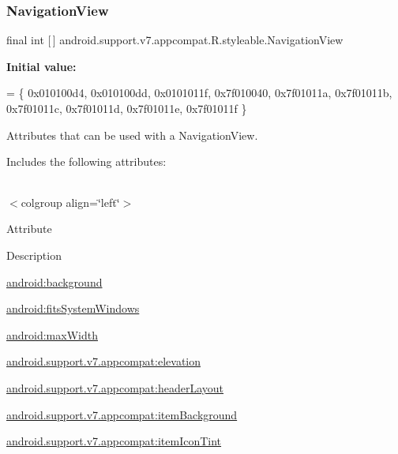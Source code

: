 \subsubsection{\texorpdfstring{Navigation\+View}{NavigationView}}
{\footnotesize\ttfamily final int \mbox{[}$\,$\mbox{]} android.\+support.\+v7.\+appcompat.\+R.\+styleable.\+Navigation\+View\hspace{0.3cm}{\ttfamily [static]}}

{\bfseries Initial value\+:}
\begin{DoxyCode}
= \{
            0x010100d4, 0x010100dd, 0x0101011f, 0x7f010040,
            0x7f01011a, 0x7f01011b, 0x7f01011c, 0x7f01011d,
            0x7f01011e, 0x7f01011f
        \}
\end{DoxyCode}
Attributes that can be used with a Navigation\+View. 

Includes the following attributes\+:

\tabulinesep=1mm
\begin{longtabu} spread 0pt [c]{*{0}{|X[-1]}|}
\hline
\end{longtabu}
$<$colgroup align=\char`\"{}left\char`\"{}$>$ 

Attribute

Description 

{\ttfamily \hyperlink{classandroid_1_1support_1_1v7_1_1appcompat_1_1R_1_1styleable_ad2f7cafaca85dee660d34efdbbba270b}{android\+:background}}

{\ttfamily \hyperlink{classandroid_1_1support_1_1v7_1_1appcompat_1_1R_1_1styleable_aec5d356c8231527e8f7c1febb5eb9892}{android\+:fits\+System\+Windows}}

{\ttfamily \hyperlink{classandroid_1_1support_1_1v7_1_1appcompat_1_1R_1_1styleable_a7ee62bbed79d58ceb628d59bef150cec}{android\+:max\+Width}}

{\ttfamily \hyperlink{classandroid_1_1support_1_1v7_1_1appcompat_1_1R_1_1styleable_a9b37fb60ab34a99e03f8fd95245baa0c}{android.\+support.\+v7.\+appcompat\+:elevation}}

{\ttfamily \hyperlink{classandroid_1_1support_1_1v7_1_1appcompat_1_1R_1_1styleable_a25d0749f6f4b3021640c947c8f4790fd}{android.\+support.\+v7.\+appcompat\+:header\+Layout}}

{\ttfamily \hyperlink{classandroid_1_1support_1_1v7_1_1appcompat_1_1R_1_1styleable_a245c0ec3356c0065fcc832a44ad5c26b}{android.\+support.\+v7.\+appcompat\+:item\+Background}}

{\ttfamily \hyperlink{classandroid_1_1support_1_1v7_1_1appcompat_1_1R_1_1styleable_a045753abfbdae682420f420a25f71659}{android.\+support.\+v7.\+appcompat\+:item\+Icon\+Tint}}

